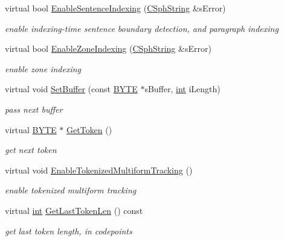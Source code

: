 \begin{DoxyCompactItemize}
virtual bool \hyperlink{classCSphMultiformTokenizer_a46811c39f9bc375d53c4eaa8907a34e8}{Enable\-Sentence\-Indexing} (\hyperlink{structCSphString}{C\-Sph\-String} \&s\-Error)
\begin{DoxyCompactList}\small\item\em enable indexing-\/time sentence boundary detection, and paragraph indexing \end{DoxyCompactList}\item 
virtual bool \hyperlink{classCSphMultiformTokenizer_a4058117d0ad1bafb6143b90d0dda902a}{Enable\-Zone\-Indexing} (\hyperlink{structCSphString}{C\-Sph\-String} \&s\-Error)
\begin{DoxyCompactList}\small\item\em enable zone indexing \end{DoxyCompactList}\item 
virtual void \hyperlink{classCSphMultiformTokenizer_acbaf2cff235e9ef2ae2a7f233d0dad8c}{Set\-Buffer} (const \hyperlink{sphinxstd_8h_a4ae1dab0fb4b072a66584546209e7d58}{B\-Y\-T\-E} $\ast$s\-Buffer, \hyperlink{sphinxexpr_8cpp_a4a26e8f9cb8b736e0c4cbf4d16de985e}{int} i\-Length)
\begin{DoxyCompactList}\small\item\em pass next buffer \end{DoxyCompactList}\item 
virtual \hyperlink{sphinxstd_8h_a4ae1dab0fb4b072a66584546209e7d58}{B\-Y\-T\-E} $\ast$ \hyperlink{classCSphMultiformTokenizer_a5803d4cc574003986d0fc9cffdb7bf8e}{Get\-Token} ()
\begin{DoxyCompactList}\small\item\em get next token \end{DoxyCompactList}\item 
virtual void \hyperlink{classCSphMultiformTokenizer_a4486959df755b4ee0be152813b6e0760}{Enable\-Tokenized\-Multiform\-Tracking} ()
\begin{DoxyCompactList}\small\item\em enable tokenized multiform tracking \end{DoxyCompactList}\item 
virtual \hyperlink{sphinxexpr_8cpp_a4a26e8f9cb8b736e0c4cbf4d16de985e}{int} \hyperlink{classCSphMultiformTokenizer_a666e297d9c9752d7001d6af319b64282}{Get\-Last\-Token\-Len} () const 
\begin{DoxyCompactList}\small\item\em get last token length, in codepoints \end{DoxyCompactList}\item 

\end{DoxyCompactItemize}
